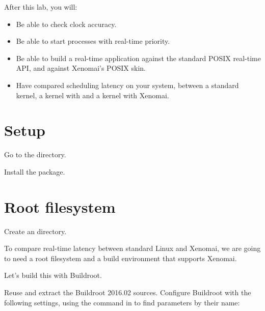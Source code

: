 
After this lab, you will:
\begin{itemize}
\item Be able to check clock accuracy.
\item Be able to start processes with real-time priority.
\item Be able to build a real-time application against the standard
POSIX real-time API, and against Xenomai's POSIX skin.
\item Have compared scheduling latency on your system, between a
  standard kernel, a kernel with  and a kernel
  with Xenomai.
\end{itemize}

\section{Setup}

Go to the  directory.

Install the  package.

\section{Root filesystem}

Create an  directory.

To compare real-time latency between standard Linux and Xenomai, we
are going to need a root filesystem and a build environment that
supports Xenomai.

Let's build this with Buildroot.

Reuse and extract the Buildroot 2016.02 sources. Configure Buildroot
with the following settings, using the \code{/} command in  to find parameters by their name:

